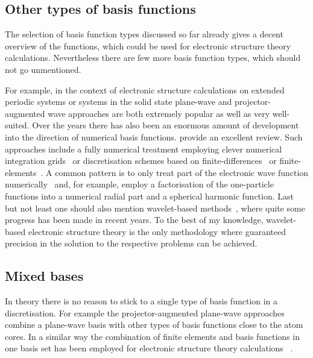 




\subsection{Other types of basis functions}
The selection of basis function types discussed so far
already gives a decent overview of the functions,
which could be used for electronic structure theory calculations.
Nevertheless there are few more basis function types,
which should not go unmentioned.

For example, in the context of electronic structure calculations
on extended periodic systems or systems in the solid state
plane-wave and projector-augmented wave approaches%
\cite{Kresse1996,Kresse1999,Mortensen2005,Enkovaara2010}
are both extremely popular as well as very well-suited.
Over the years there has also been an enormous amount of development
into the direction of numerical basis functions.
\citet{Frediani2015} provide an excellent review.
Such approaches include a fully numerical treatment employing clever
numerical integration grids~\cite{Losilla2012DCRsp,Toivanen2015,Enkovaara2010}
or discretisation schemes
based on finite-differences~\cite{Kobus2013}
or finite-elements~\cite{Tsuchida1995,Briggs1996,%
Pask05,Lehtovaara2009,Alizadegan2010,Avery2011PhD,Davydov2015,Boffi2016}.
A common pattern is to only treat part of the electronic
wave function numerically~\cite{Fischer1978,Soler2002,LUCAS}
and, for example,
employ a factorisation of the one-particle functions
into a numerical radial part and a spherical harmonic function.
Last but not least one should also mention
wavelet-based methods~\cite{Bischoff2011,Bischoff2012,Bischoff2013,Bischoff2014,Bischoff2014a,Bischoff2017},
where quite some progress has been made in recent years.
To the best of my knowledge, wavelet-based electronic structure theory
is the only methodology where guaranteed precision in the solution to the
respective problems can be achieved.

\subsection{Mixed bases}
In theory there is no reason to stick to a single type of basis function
in a discretisation.
For example the projector-augmented plane-wave
approaches~\cite{Kresse1996,Kresse1999,Mortensen2005,Enkovaara2010}
combine a plane-wave basis
with other types of basis functions close to the atom cores.
In a similar way the combination of finite elements
and \cGTO basis functions in one basis set has been employed
for electronic structure theory calculations%
~\cite{Yamakawa2005,Kurashige2007,Watson2008}.


